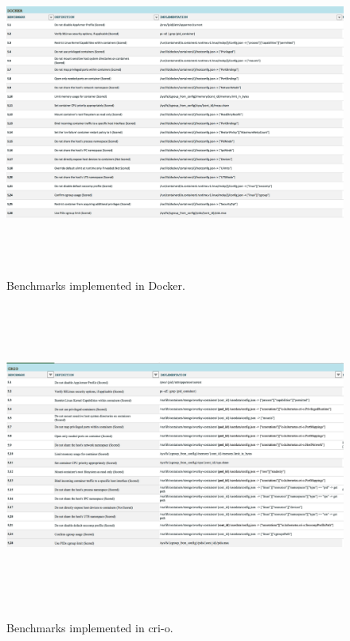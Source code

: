 \documentclass[times, twoside, watermark]{zHenriquesLab-StyleBioRxiv}
\begin{document}
\begin{figure}
    \caption{Benchmarks implemented in Docker.}
    \centering
      \includegraphics[width=\textwidth,height=10cm]{figures/docker}
      \label{fig:docker}
  \end{figure}


  \begin{figure}
    \caption{Benchmarks implemented in cri-o.}
    \centering
      \includegraphics[width=\textwidth,height=10cm]{figures/crio}
      \label{fig:crio}
  \end{figure}
\end{document}
